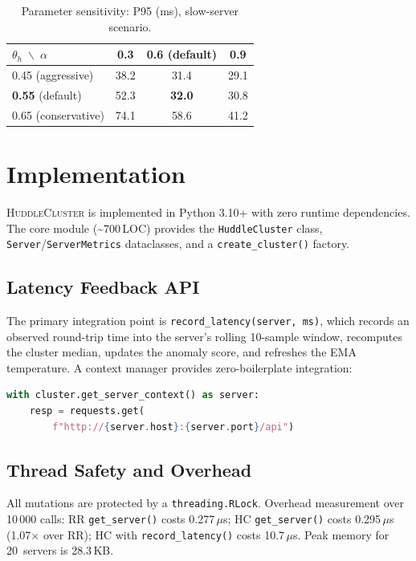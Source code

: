 \documentclass[10pt,twocolumn]{article}
\begin{document}
\begin{table}[h]
\centering
\caption{Parameter sensitivity: P95 (ms), slow-server scenario.}
\label{tab:sensitivity}
\small
\begin{tabular}{lccc}
\toprule
$\theta_h \;\backslash\; \alpha$ & 0.3 & 0.6 (default) & 0.9 \\
\midrule
0.45 (aggressive)  & 38.2 & 31.4 & 29.1 \\
\textbf{0.55} (default) & 52.3 & \textbf{32.0} & 30.8 \\
0.65 (conservative) & 74.1 & 58.6 & 41.2 \\
\bottomrule
\end{tabular}
\end{table}

\section{Implementation}
\label{sec:impl}

\textsc{HuddleCluster} is implemented in Python 3.10+ with zero runtime
dependencies.
The core module (\textasciitilde{}700\,LOC) provides the
\texttt{HuddleCluster} class, \texttt{Server}/\texttt{ServerMetrics}
dataclasses, and a \texttt{create\_cluster()} factory.

\subsection{Latency Feedback API}

The primary integration point is \texttt{record\_latency(server,~ms)},
which records an observed round-trip time into the server's rolling
10-sample window, recomputes the cluster median, updates the anomaly
score, and refreshes the EMA temperature.
A context manager provides zero-boilerplate integration:

\begin{lstlisting}[language=Python]
with cluster.get_server_context() as server:
    resp = requests.get(
        f"http://{server.host}:{server.port}/api")
\end{lstlisting}

\subsection{Thread Safety and Overhead}

All mutations are protected by a \texttt{threading.RLock}.
Overhead measurement over 10\,000 calls:
RR \texttt{get\_server()} costs 0.277\,$\mu$s;
HC \texttt{get\_server()} costs 0.295\,$\mu$s (1.07$\times$ over RR);
HC with \texttt{record\_latency()} costs 10.7\,$\mu$s.
Peak memory for 20~servers is 28.3\,KB.
\end{document}
